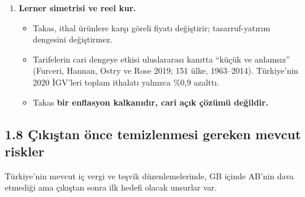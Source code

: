 \begin{enumerate}
  \begin{itemize}
  \tightlist
  \item
    MFN tarifesi bağlı oran içindeyse DTÖ'ye uygundur; AB'nin DTÖ temelli misilleme hakkı doğmaz.
  \item
    AB'nin elindeki diğer araçlar §4.4'te: ticaret savunması, çelik tüzüğü, SKDM, onaylanmış kuruluşlar, menşe kuralları ve siyasi araçlar.
  \end{itemize}
\item
  \textbf{Lerner simetrisi ve reel kur.}

  \begin{itemize}
  \tightlist
  \item
    Takas, ithal ürünlere karşı göreli fiyatı değiştirir; tasarruf-yatırım dengesini değiştirmez.
  \item
    Tarifelerin cari dengeye etkisi uluslararası kanıtta ``küçük ve anlamsız'' (Furceri, Hannan, Ostry ve Rose 2019; 151 ülke, 1963--2014). Türkiye'nin 2020 İGV'leri toplam ithalatı yalnızca \%0,9 azalttı.
  \item
    Takas \textbf{bir enflasyon kalkanıdır, cari açık çözümü değildir.}
  \end{itemize}
\end{enumerate}

\hypertarget{02a_politika_uzayi-18-uxe7ux131kux131ux15ftan-uxf6nce-temizlenmesi-gereken-mevcut-riskler}{%
\subsection{1.8 Çıkıştan önce temizlenmesi gereken mevcut riskler}\label{02a_politika_uzayi-18-uxe7ux131kux131ux15ftan-uxf6nce-temizlenmesi-gereken-mevcut-riskler}}

Türkiye'nin mevcut iç vergi ve teşvik düzenlemelerinde, GB içinde AB'nin dava etmediği ama çıkıştan sonra ilk hedefi olacak unsurlar var.

\begingroup\gbtablo\small

